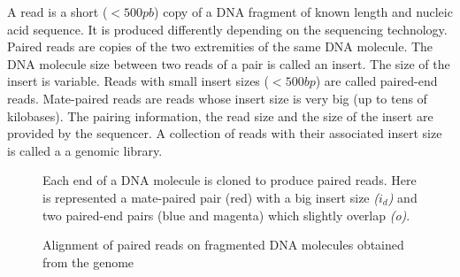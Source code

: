 \documentclass[12pt]{article}
\begin{document}
A read is a short ($<500pb$) copy of a DNA fragment of known length and nucleic acid sequence. It is produced differently depending on the sequencing technology. Paired reads are copies of the two extremities of the same DNA molecule. The DNA molecule size between two reads of a pair is called an insert. The size of the insert is variable. Reads with small insert sizes ($<500bp$) are called paired-end reads. Mate-paired reads are reads whose insert size is very big (up to tens of kilobases). The pairing information, the read size and the size of the insert are provided by the sequencer. A collection of reads with their associated insert size is called a a genomic library.
\begin{figure}[h!]
\hspace*{3cm}
\caption{Alignment of paired reads on fragmented DNA molecules obtained from the genome}
\label{fig:reads}
{\footnotesize  Each end of a DNA molecule is cloned to produce paired reads. Here is represented a mate-paired pair (red) with a big insert size \textit{($i_d$)} and two paired-end pairs (blue and magenta) which slightly overlap \textit{(o)}. }
\end{figure}\\
\end{document}
